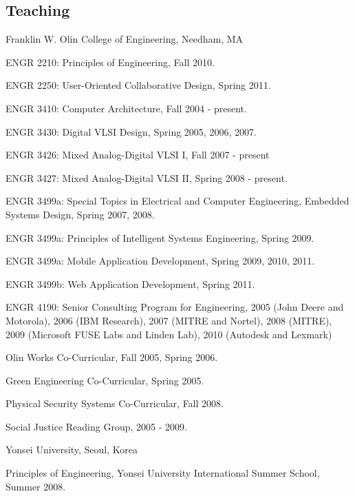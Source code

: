 \documentclass[line]{res}
\newenvironment{list1}{
  \begin{list}{\ding{113}}{%
      \setlength{\itemsep}{0in}
      \setlength{\parsep}{0in} \setlength{\parskip}{0in}
      \setlength{\topsep}{0in} \setlength{\partopsep}{0in} 
      \setlength{\leftmargin}{0.17in}}}{\end{list}}
\begin{document}
\begin{resume}
	\section{\sc Teaching}
	
	Franklin W. Olin College of Engineering, Needham, MA\\
	\vspace{-.1in} 
	\begin{list1}
		\item[] ENGR 2210: Principles of Engineering, Fall 2010. 
		\item[] ENGR 2250: User-Oriented Collaborative Design, Spring 2011. 
		\item[] ENGR 3410: Computer Architecture, Fall 2004 - present. 
		\item[] ENGR 3430: Digital VLSI Design, Spring 2005, 2006, 2007. 
		\item[] ENGR 3426: Mixed Analog-Digital VLSI I, Fall 2007 - present 
		\item[] ENGR 3427: Mixed Analog-Digital VLSI II, Spring 2008 - present. 
		\item[] ENGR 3499a: Special Topics in Electrical and Computer Engineering, Embedded Systems Design, Spring 2007, 2008. 
		\item[] ENGR 3499a: Principles of Intelligent Systems Engineering, Spring 2009. 
		\item[] ENGR 3499a: Mobile Application Development, Spring 2009, 2010, 2011. 
		\item[] ENGR 3499b: Web Application Development, Spring 2011. 
		\item[] ENGR 4190: Senior Consulting Program for Engineering, 2005 (John Deere and Motorola), 2006 (IBM Research), 2007 (MITRE and Nortel), 2008 (MITRE), 2009 (Microsoft FUSE Labs and Linden Lab), 2010 (Autodesk and Lexmark) 
		\item[] Olin Works Co-Curricular, Fall 2005, Spring 2006. 
		\item[] Green Engineering Co-Curricular, Spring 2005. 
		\item[] Physical Security Systems Co-Curricular, Fall 2008. 
		\item[] Social Justice Reading Group, 2005 - 2009. 
	\end{list1}
	
	Yonsei University, Seoul, Korea\\
	\vspace{-.1in} 
	\begin{list1}
		\item[] Principles of Engineering, Yonsei University International Summer School, Summer 2008. 
	\end{list1}
	

\end{resume}
\end{document}
